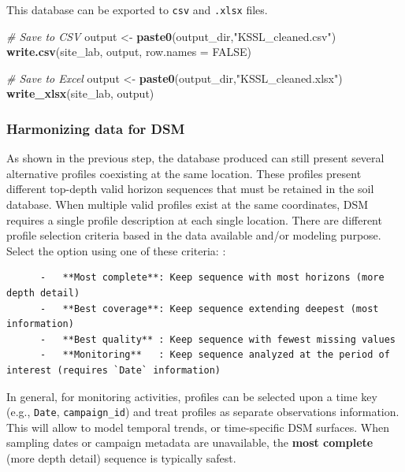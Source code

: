 \documentclass[
  10pt,
  b5paper,
  oneside]{book}
\newenvironment{Shaded}{\begin{snugshade}}{\end{snugshade}}
\newcommand{\AttributeTok}[1]{\textcolor[rgb]{0.13,0.29,0.53}{#1}}
\newcommand{\CommentTok}[1]{\textcolor[rgb]{0.56,0.35,0.01}{\textit{#1}}}
\newcommand{\ConstantTok}[1]{\textcolor[rgb]{0.56,0.35,0.01}{#1}}
\newcommand{\FunctionTok}[1]{\textcolor[rgb]{0.13,0.29,0.53}{\textbf{#1}}}
\newcommand{\NormalTok}[1]{#1}
\newcommand{\OtherTok}[1]{\textcolor[rgb]{0.56,0.35,0.01}{#1}}
\newcommand{\StringTok}[1]{\textcolor[rgb]{0.31,0.60,0.02}{#1}}
\begin{document}
This database can be exported to \texttt{csv} and \texttt{.xlsx} files.

\begin{Shaded}
\begin{Highlighting}[]
\CommentTok{\# Save to CSV}
\NormalTok{output }\OtherTok{\textless{}{-}} \FunctionTok{paste0}\NormalTok{(output\_dir,}\StringTok{"KSSL\_cleaned.csv"}\NormalTok{)}
\FunctionTok{write.csv}\NormalTok{(site\_lab, output, }\AttributeTok{row.names =} \ConstantTok{FALSE}\NormalTok{)}

\CommentTok{\# Save to Excel}
\NormalTok{output }\OtherTok{\textless{}{-}} \FunctionTok{paste0}\NormalTok{(output\_dir,}\StringTok{"KSSL\_cleaned.xlsx"}\NormalTok{)}
\FunctionTok{write\_xlsx}\NormalTok{(site\_lab, output)}
\end{Highlighting}
\end{Shaded}

\subsubsection{Harmonizing data for DSM}\label{harmonizing-data-for-dsm}

As shown in the previous step, the database produced can still present several alternative profiles coexisting at the same location. These profiles present different top-depth valid horizon sequences that must be retained in the soil database. When multiple valid profiles exist at the same coordinates, DSM requires a single profile description at each single location. There are different profile selection criteria based in the data available and/or modeling purpose. Select the option using one of these criteria: :

\begin{verbatim}
      -   **Most complete**: Keep sequence with most horizons (more depth detail)
      -   **Best coverage**: Keep sequence extending deepest (most information)
      -   **Best quality** : Keep sequence with fewest missing values
      -   **Monitoring**   : Keep sequence analyzed at the period of interest (requires `Date` information)
\end{verbatim}

In general, for monitoring activities, profiles can be selected upon a time key (e.g., \texttt{Date}, \texttt{campaign\_id}) and treat profiles as separate observations information. This will allow to model temporal trends, or time-specific DSM surfaces. When sampling dates or campaign metadata are unavailable, the \textbf{most complete} (more depth detail) sequence is typically safest.
\end{document}
